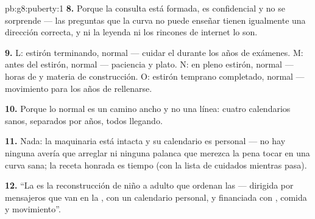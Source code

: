 \begin{solution}{pb:g8:puberty:1}
\textbf{8.} Porque la consulta está formada, es confidencial y no se
sorprende --- las preguntas que la curva no puede enseñar tienen
igualmente una dirección correcta, y ni la leyenda ni los rincones de
internet lo son.

\textbf{9.} L: estirón terminando, normal --- cuidar el  durante
los años de exámenes. M: antes del estirón, normal --- paciencia y
plato. N: en pleno estirón, normal --- horas de  y materia de
construcción. O: estirón temprano completado, normal --- movimiento
para los años de rellenarse.

\textbf{10.} Porque lo normal es un camino ancho y no una línea: cuatro
calendarios sanos, separados por años, todos llegando.

\textbf{11.} Nada: la maquinaria está intacta y su calendario es
personal --- no hay ninguna avería que arreglar ni ninguna palanca que
merezca la pena tocar en una curva sana; la receta honrada es tiempo
(con la lista de cuidados mientras pasa).

\textbf{12.} ``La  es la reconstrucción de niño a adulto que
ordenan las  --- dirigida por mensajeros que van en la ,
con un calendario personal, y financiada con , comida y
movimiento''.
\end{solution}
